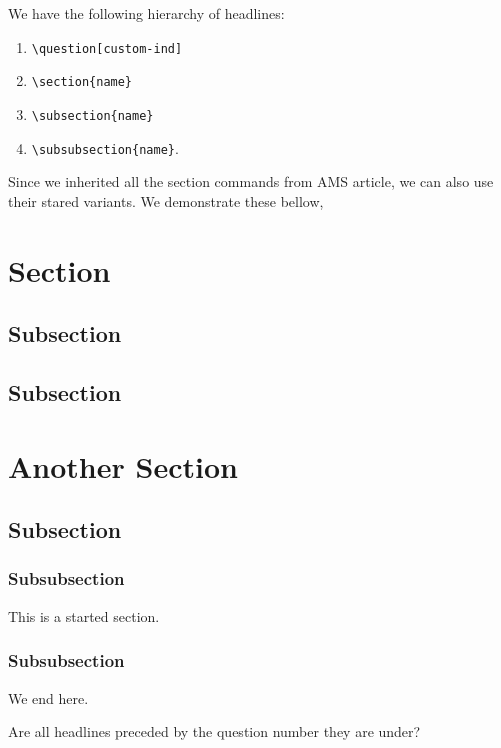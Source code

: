 \documentclass{homework}
\newcommand{\bk}{\textbackslash}
\renewcommand\tt[1]{\texttt{#1}}
\begin{document}
\begin{sol}
  We have the following hierarchy of headlines:
  \begin{enumerate}
    \item \tt{\bk question[custom-ind]}
    \item \tt{\bk section\{name\}}
    \item \tt{\bk subsection\{name\}}
    \item \tt{\bk subsubsection\{name\}}.
  \end{enumerate}

  Since we inherited all the section commands from AMS article, we can
  also use their stared variants. We demonstrate these bellow,
  \section{Section}
  \subsection{Subsection}
  \subsection{Subsection}
  \section{Another Section}
  \subsection{Subsection}
  \subsubsection*{Subsubsection} This is a started section.
  \subsubsection{Subsubsection} We end here.

\end{sol}

\question Are all headlines preceded by the question number they are under?
\end{document}

